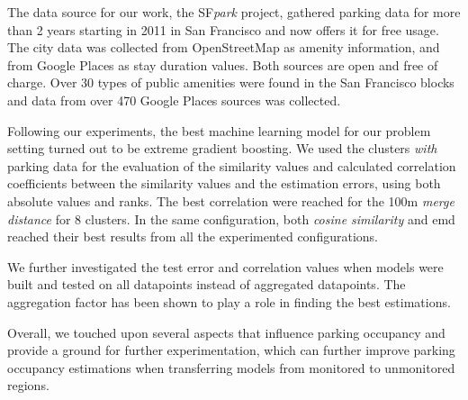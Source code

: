 	The data source for our work, the SF\textit{park} project, gathered parking data for more than 2 years starting in 2011 in San Francisco and now offers it for free usage.
	The city data was collected from OpenStreetMap as amenity information, and from Google Places as stay duration values.
	Both sources are open and free of charge.
	Over 30 types of public amenities were found in the San Francisco blocks and data from over 470 Google Places sources was collected.
	
	Following our experiments, the best machine learning model for our problem setting turned out to be extreme gradient boosting.
	We used the clusters \textit{with} parking data for the evaluation of the similarity values and calculated correlation coefficients between the similarity values and the estimation errors, using both absolute values and ranks.
	The best correlation were reached for the 100m \textit{merge distance} for 8 clusters.
	In the same configuration, both \textit{cosine similarity} and emd reached their best results from all the experimented configurations.
	
	We further investigated the test error and correlation values when models were built and tested on all datapoints instead of aggregated datapoints. The aggregation factor has been shown to play a role in finding the best estimations.
	
	Overall, we touched upon several aspects that influence parking occupancy and provide a ground for further experimentation, which can further improve parking occupancy estimations when transferring models from monitored to unmonitored regions.